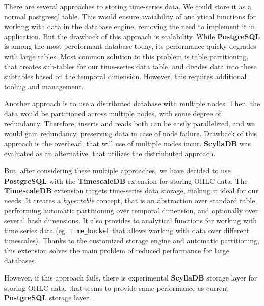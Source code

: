 There are several approaches to storing time-series data. We could store it as a normal postgresql table.
This would ensure avaiability of analytical functions for working with data in the database engine, removing the
need to implement it in application. But the drawback of this approach is scalability. While \textbf{PostgreSQL} is
among the most peroformant database today, its performance quicky degrades with large tables. Most common solution to this problem is table partitioning, that creates sub-tables for our time-series
data table, and divides data into these subtables based on the temporal dimension. However, this requires additional
tooling and management.

Another approach is to use a distributed database with multiple nodes. Then, the data would be partitioned across multiple nodes,
with some degree of redundancy. Therefore, inserts and reads both can be easily parallelized, and we would gain redundancy,
preserving data in case of node failure. Drawback of this approach is the overhead, that will use of multiple nodes incur.
\textbf{ScyllaDB} was evaluated as an alternative, that utilizes the distriubuted approach.

But, after considering these multiple approaches, we have decided to use \textbf{PostgreSQL} with the \textbf{TimescaleDB}
extension for storing OHLC data. The \textbf{TimescaleDB} extension targets time-series data storage, making it ideal for our needs.
It creates a \textit{hypertable} concept, that is an abstraction over standard table, perfrorming automatic partitioning over
temporal dimension, and optionally over several hash dimensions. It also provides to analytical functions for working with time
series data (eg. \verb|time_bucket| that allows working with data over different timescales). Thanks to the
customized storage engine and automatic partitioning, this extension solves the main problem of reduced performance
for large databases.

However, if this approach fails, there is experimental \textbf{ScyllaDB} storage layer for storing OHLC data,
that seems to provide same performance as current \textbf{PostgreSQL} storage layer.




